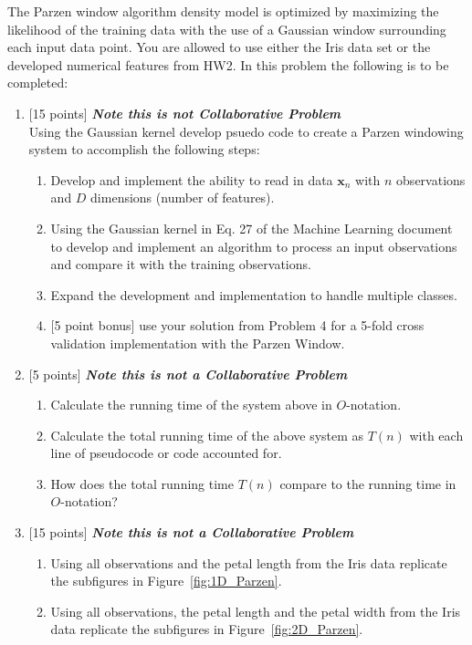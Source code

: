\documentclass{article}
\begin{document}
\begin{enumerate}
The Parzen window algorithm density model is optimized by maximizing the likelihood of the training data with the use of a Gaussian window surrounding each input data point. You are allowed to use either the Iris data set or the developed numerical features from HW2. In this problem the following is to be completed:\\
		\begin{enumerate}
			\item {[15 points]} \textbf{\emph{Note this is not Collaborative Problem}}\\
			Using the Gaussian kernel develop psuedo code to create a Parzen windowing system to accomplish the following steps:
				\begin{enumerate}
					\item Develop and implement the ability to read in data $\textbf{x}_n$ with $n$ observations and $D$ dimensions (number of features).
					\item Using the Gaussian kernel in Eq. 27 of the Machine Learning document to develop and implement an algorithm to process an input observations and compare it with the training observations.
					\item Expand the development and implementation to handle multiple classes.
					\item {[5 point bonus]} use your solution from Problem 4 for a 5-fold cross validation implementation with the Parzen Window. 
				\end{enumerate}
			\item {[5 points]} \textbf{\emph{Note this is not a Collaborative Problem}}
				\begin{enumerate}
					\item Calculate the running time of the system above in $O$-notation.
					\item Calculate the total running time of the above system as $T(n)$ with each line of pseudocode or code accounted for.
					\item How does the total running time $T(n)$ compare to the running time in $O$-notation?
				\end{enumerate}
			\item {[15 points]} \textbf{\emph{Note this is not a Collaborative Problem}}
				\begin{enumerate}
					\item Using all observations and the petal length from the Iris data replicate the subfigures in Figure~\ref{fig:1D_Parzen}.  
					\item Using all observations, the petal length and the petal width from the Iris data replicate the subfigures in Figure~\ref{fig:2D_Parzen}.  
				\end{enumerate}
		\end{enumerate}


\end{enumerate}
\end{document}
